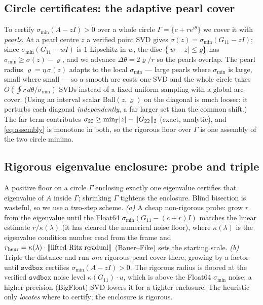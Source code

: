 \documentclass[11pt]{article}
\newcommand{\sig}{\sigma}
\newcommand{\sigmin}{\sigma_{\min}}
\DeclarePairedDelimiter{\norm}{\lVert}{\rVert}
\DeclarePairedDelimiter{\abs}{\lvert}{\rvert}
\newcommand{\Ball}{\mathrm{Ball}}
\newcommand{\svdbox}{\texttt{svdbox}}
\begin{document}
\subsection{Circle certificates: the adaptive pearl cover}\label{sec:pearl}

To certify $\sigmin(A-zI)>0$ over a whole circle $\Gamma=\{c+r e^{i\theta}\}$ we cover it with
\emph{pearls}. At a pearl centre $z$ a verified point SVD gives $\sig(z)=\sigmin(G_{11}-zI)$; since
$\sigmin(G_{11}-wI)$ is $1$-Lipschitz in $w$, the disc $\{\abs{w-z}\le\varrho\}$ has $\sigmin\ge\sig(z)-\varrho$, and we advance $\Delta\theta=2\varrho/r$ so the pearls overlap. The pearl radius
$\varrho=\eta\,\sig(z)$ adapts to the local $\sigmin$ --- large pearls where $\sigmin$ is large, small
where small --- so a smooth arc costs one SVD and the whole circle takes $O(\oint r\,d\theta/\sigmin)$
SVDs instead of a fixed uniform sampling with a global arc-cover. (Using an interval scalar
$\Ball(z,\varrho)$ on the diagonal is much looser: it perturbs each diagonal \emph{independently},
a far larger set than the common shift.) The far term contributes $\sig_{22}\ge\min_\Gamma\abs{z}
-\norm{G_{22}}_2$ (exact, analytic), and \eqref{eq:assembly} is monotone in both, so the rigorous
floor over $\Gamma$ is one assembly of the two circle minima.

\subsection{Rigorous eigenvalue enclosure: probe and triple}\label{sec:enclose}

A positive floor on a circle $\Gamma$ enclosing exactly one eigenvalue certifies that eigenvalue of
$A$ inside $\Gamma$; shrinking $\Gamma$ tightens the enclosure. Blind bisection is wasteful, so we use
a two-step scheme. \emph{(a)} A cheap non-rigorous probe: grow $r$ from the eigenvalue until the
Float64 $\sigmin(G_{11}-(c+r)I)$ matches the linear estimate $r/\kappa(\lambda)$ (it has cleared the
numerical noise floor), where $\kappa(\lambda)$ is the eigenvalue condition number read from the frame
and $r_{\mathrm{heur}}=\kappa(\lambda)\cdot\norm{\text{lifted Ritz residual}}$ (Bauer--Fike) sets the
starting scale. \emph{(b)} Triple the distance and run \emph{one} rigorous pearl cover there, growing
by a factor until $\svdbox$ certifies $\sigmin(A-zI)>0$. The rigorous radius is floored at the verified
$\svdbox$ noise level $\kappa(G_{11})\cdot u$, which is above the Float64 $\sigmin$ noise; a
higher-precision (BigFloat) SVD lowers it for a tighter enclosure. The heuristic only \emph{locates}
where to certify; the enclosure is rigorous.
\end{document}
